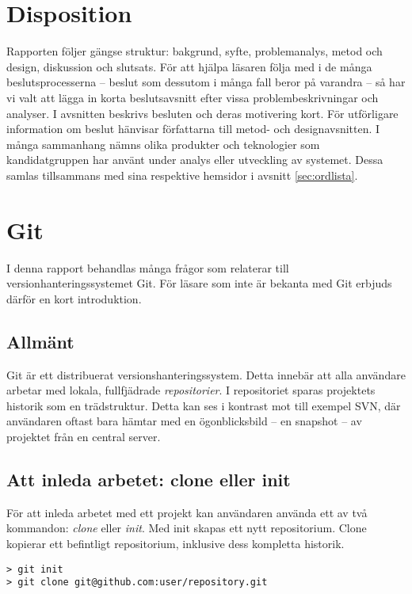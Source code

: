 \section{Disposition}

Rapporten följer gängse struktur: bakgrund, syfte, problemanalys, metod och design, diskussion och slutsats. För att hjälpa läsaren följa med i
de många beslutsprocesserna – beslut som dessutom i många fall beror på varandra – så har vi valt att lägga in korta beslutsavsnitt efter vissa
problembeskrivningar och analyser. I avsnitten beskrivs besluten och deras motivering kort. För utförligare information om beslut hänvisar
författarna till metod- och designavsnitten. I många sammanhang nämns olika produkter och teknologier som kandidatgruppen har använt under analys
eller utveckling av systemet. Dessa samlas tillsammans med sina respektive hemsidor i avsnitt \ref{sec:ordlista}.

\section{Git}
I denna rapport behandlas många frågor som relaterar till versionhanteringssystemet Git. 
För läsare som inte är bekanta med Git erbjuds därför en kort introduktion.

\subsection{Allmänt}
Git är ett distribuerat versionshanteringssystem. Detta innebär att alla användare arbetar med lokala, fullfjädrade \emph{repositorier}. I repositoriet sparas projektets historik som en trädstruktur. Detta kan ses i kontrast mot till exempel SVN, där användaren oftast bara hämtar med en ögonblicksbild – en snapshot – av projektet från en central server.

\subsection{Att inleda arbetet: clone eller init}
För att inleda arbetet med ett projekt kan användaren använda ett av två kommandon: \emph{clone} eller \emph{init}. Med init skapas ett nytt repositorium. Clone kopierar ett befintligt repositorium, inklusive dess kompletta historik.

\begin{Verbatim}
> git init
> git clone git@github.com:user/repository.git
\end{Verbatim}

